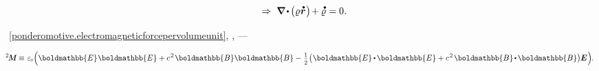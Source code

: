 \nopagebreak\vspace{-0.1em}\begin{equation}\label{continuity.balanceofelectriccharge}
\hspace*{1em}\Rightarrow\hspace{.7ex}
\boldnabla \hspace{-0.15ex} \dotp \hspace{-0.15ex} \bigl( \chargedensity \hspace{.1ex} \mathdotabove{\locationvector} \hspace{.1ex} \bigr) \hspace{-0.3ex} + \mathdotabove{\chargedensity} \hspace{.1ex} = 0
\hspace{.1ex} .
\vspace{-0.5em}\end{equation}


 ~\eqref{ponderomotive.electromagneticforcepervolumeunit},   , \:---  \href{https://en.wikipedia.org/wiki/Maxwell_stress_tensor}{ }

\nopagebreak\en{\vspace{-0.1em}}\ru{\vspace{-0.25em}}\begin{equation}\label{maxwellstresstensor:definition}
\maxwellstress \equiv \hspace{.12ex}
\vacuumpermittivity \hspace{-0.33ex} \left(
\boldmathbb{E} \hspace{.1ex} \boldmathbb{E} + c^{\hspace{.16ex}2} \hspace{.22ex} \boldmathbb{B} \boldmathbb{B}
- \hspace{.1ex} \smalldisplaystyleonehalf \hspace{.1ex} \bigl( \hspace{.1ex} \boldmathbb{E} \hspace{-0.1ex} \dotp \hspace{-0.15ex} \boldmathbb{E} + c^{\hspace{.16ex}2} \hspace{.22ex} \boldmathbb{B} \hspace{-0.2ex} \dotp \hspace{-0.16ex} \boldmathbb{B} \bigr) \hspace{-0.06ex} \UnitDyad \hspace{.05ex}
\right) \hspace{-0.22em} .
\end{equation}

